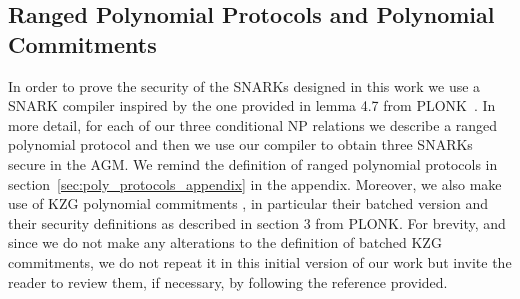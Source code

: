 \subsection{Ranged Polynomial Protocols and Polynomial Commitments}
In order to prove the security of the SNARKs designed in this work we use a SNARK compiler inspired by the one provided in lemma 4.7 from 
PLONK~\cite{plonk}. In more detail, for each of our three conditional NP relations we describe a ranged polynomial protocol and then we use our compiler to obtain three SNARKs 
secure in the AGM. We remind the definition of ranged polynomial protocols in section~\ref{sec:poly_protocols_appendix} in the appendix. Moreover, we also make use of 
KZG polynomial commitments \cite{KZG_10}, in particular their batched version and their security definitions as described in section 3 from PLONK. For brevity, 
and since we do not make any alterations to the definition of batched KZG commitments, we do not repeat it in this initial version of our work but invite the reader 
to review them, if necessary, by following the reference provided. 


